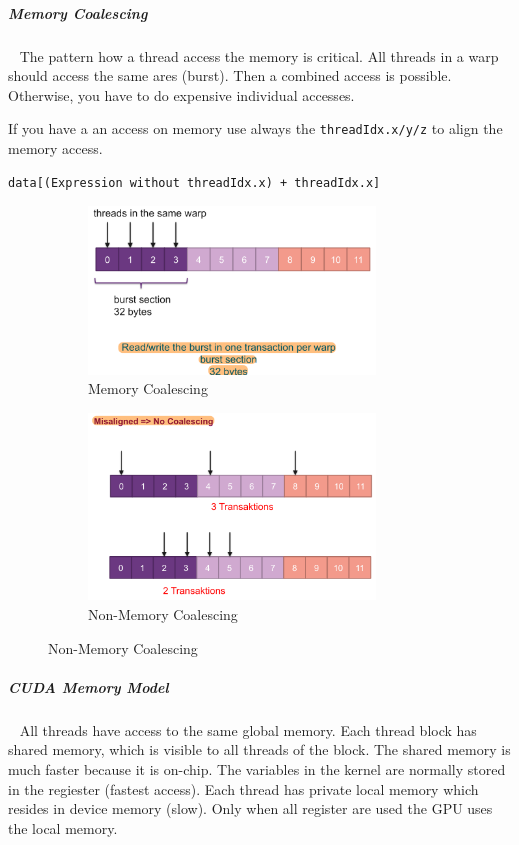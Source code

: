 \documentclass[11pt,twoside,landscape]{article}
\begin{document}
\begin{multicols}{3}
{{\subparagraph{Memory Coalescing} \
\label{sec:org2f44557}
The pattern how a thread access the memory is critical.
All threads in a warp should access the same ares (burst).
Then a combined access is possible.
Otherwise, you have to do expensive individual accesses.


If you have a an access on memory use always the \texttt{threadIdx.x/y/z} to align the memory access.

\begin{lstlisting}
data[(Expression without threadIdx.x) + threadIdx.x]
\end{lstlisting}


\begin{figure}[H]
  \centering
  \begin{subfigure}{0.4\textwidth}
    \includegraphics[width=3in]{img/memory_coalescing.png}
    \caption{Memory Coalescing\label{fig:memory-coalescing}}
  \end{subfigure}
  \hfill
  \begin{subfigure}{0.4\textwidth}
    \includegraphics[width=3in]{img/no_memory_coalescing.png}
    \caption{Non-Memory Coalescing\label{fig:non-memory-coalescing}}
  \end{subfigure}
\end{figure}

\subparagraph{CUDA Memory Model} \
\label{sec:orgede2a44}
All threads have access to the same global memory.
Each thread block has shared memory, which is visible to all threads of the block.
The shared memory is much faster because it is on-chip.
The variables in the kernel are normally stored in the regiester (fastest access).
Each thread has private local memory which resides in device memory (slow).
Only when all register are used the GPU uses the local memory.


}}
\end{multicols}
\end{document}
